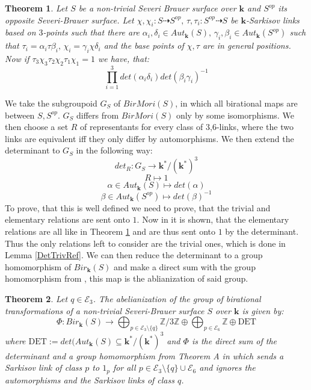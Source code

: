 \documentclass[12pt, oneside, reqno]{amsart}
\newtheorem{maintheorem}{Theorem}
\begin{document}
\begin{maintheorem} \label{MainA}
    Let $S$ be a non-trivial Severi Brauer surface over $\textbf{k}$ and $S^{op}$ its opposite Severi-Brauer surface. Let $\chi, \chi_i: S \dashrightarrow S^{op}, \, \tau, \tau_i:S^{op} \dashrightarrow S$ be $\textbf{k}$-Sarkisov links based on $3$-points such that there are $\alpha_i, \delta_i \in Aut_{\textbf{k}}(S), \, \gamma_i, \beta_i \in Aut_{\textbf{k}}(S^{op})$ such that $\tau_i = \alpha_i \tau \beta_i, \, \chi_i = \gamma_i \chi \delta_i$ and the base points of $\chi, \tau$ are in general positions. Now if $\tau_3 \chi_3 \tau_2 \chi_2 \tau_1 \chi_1 = 1$ we have, that: \[\prod_{i=1}^3 det(\alpha_i\delta_i)det(\beta_i\gamma_i)^{-1}\]
\end{maintheorem}
\noindent We take the subgroupoid $G_S$ of $BirMori(S)$, in which all birational maps are between $S,S^{op}$. $G_S$ differs from $BirMori(S)$ only by some isomorphisms. We then choose a set $R$ of representants for every class of $3$,$6$-links, where the two links are equivalent iff they only differ by automorphisms. We then extend the determinant to $G_S$ in the following way: \[det_R: G_S \rightarrow \textbf{k}^*/(\textbf{k}^*)^3\] \[R \mapsto 1\] \[\alpha \in Aut_{\textbf{k}}(S) \mapsto det(\alpha)\] \[\beta \in Aut_{\textbf{k}}(S^{op}) \mapsto det(\beta)^{-1}\] To prove, that this is well defined we need to prove, that the trivial and elementary relations are sent onto $1$. Now in \cite{BSY} it is shown, that the elementary relations are all like in Theorem \ref{MainA} and are thus sent onto $1$ by the determinant. Thus the only relations left to consider are the trivial ones, which is done in Lemma \ref{DetTrivRef}. We can then reduce the determinant to a group homomorphism of $Bir_{\textbf{k}}(S)$ and make a direct sum with the group homomorphism from \cite{BSY}, this map is the ablianization of said group.

\begin{maintheorem} \label{MainB}
Let $q \in \mathcal{E}_3$. The abelianization of the group of birational transformations of a non-trivial Severi-Brauer surface $S$ over $\textbf{k}$ is given by: 
    \[\Phi:Bir_{\textbf{k}}(S) \rightarrow \bigoplus_{p \in \mathcal{E}_3 \setminus \{ q \}} \mathbb{Z}/3\mathbb{Z} \oplus \bigoplus_{p \in \mathcal{E}_6} \mathbb{Z} \oplus \textrm{DET}\]
    where $\textrm{DET} := det(Aut_{\textbf{k}}(S) \subseteq \textbf{k}^* / (\textbf{k}^*)^3$ and $\Phi$ is the direct sum of the determinant and a group homomorphism from Theorem A in \cite{BSY} which sends a Sarkisov link of class $p$ to $1_p$ for all $p \in \mathcal{E}_3 \setminus \{ q \} \cup \mathcal{E}_6$ and ignores the automorphisms and the Sarkisov links of class $q$.
\end{maintheorem}
\end{document}
